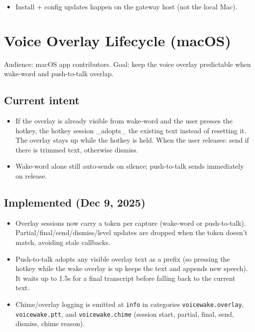 \begin{itemize}
  \item Install + config updates happen on the gateway host (not the local Mac).
\end{itemize}



\clearpage

\section{Voice Overlay Lifecycle (macOS)}


Audience: macOS app contributors. Goal: keep the voice overlay predictable when wake-word and push-to-talk overlap.

\subsection{Current intent}


\begin{itemize}
  \item If the overlay is already visible from wake-word and the user presses the hotkey, the hotkey session \_adopts\_ the existing text instead of resetting it. The overlay stays up while the hotkey is held. When the user releases: send if there is trimmed text, otherwise dismiss.
  \item Wake-word alone still auto-sends on silence; push-to-talk sends immediately on release.
\end{itemize}


\subsection{Implemented (Dec 9, 2025)}


\begin{itemize}
  \item Overlay sessions now carry a token per capture (wake-word or push-to-talk). Partial/final/send/dismiss/level updates are dropped when the token doesn’t match, avoiding stale callbacks.
  \item Push-to-talk adopts any visible overlay text as a prefix (so pressing the hotkey while the wake overlay is up keeps the text and appends new speech). It waits up to 1.5s for a final transcript before falling back to the current text.
  \item Chime/overlay logging is emitted at \texttt{info} in categories \texttt{voicewake.overlay}, \texttt{voicewake.ptt}, and \texttt{voicewake.chime} (session start, partial, final, send, dismiss, chime reason).
\end{itemize}


